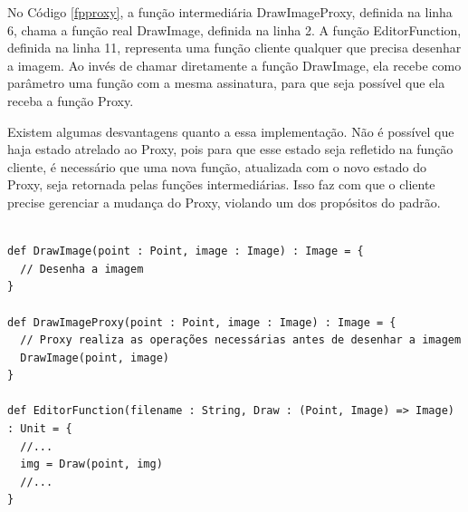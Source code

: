 No Código \ref{fpproxy}, a função intermediária 
DrawImageProxy, definida na linha 6, chama a 
função real DrawImage, definida na linha 2. 
A função EditorFunction, definida na linha 11, 
representa uma função cliente qualquer que 
precisa desenhar a imagem. Ao invés de chamar 
diretamente a função DrawImage, ela recebe 
como parâmetro uma função com a mesma assinatura, 
para que seja possível que ela receba a função 
Proxy.

Existem algumas desvantagens quanto a essa 
implementação. Não é possível que haja 
estado atrelado ao Proxy, pois para que 
esse estado seja refletido na função 
cliente, é necessário que uma nova função, 
atualizada com o novo estado do Proxy, seja 
retornada pelas funções intermediárias. 
Isso faz com que o cliente precise gerenciar 
a mudança do Proxy, violando 
um dos propósitos do padrão. 

\begin{lstlisting}[caption={Proxy Funcional.},label=fpproxy]
    
def DrawImage(point : Point, image : Image) : Image = {
  // Desenha a imagem
}

def DrawImageProxy(point : Point, image : Image) : Image = {
  // Proxy realiza as operações necessárias antes de desenhar a imagem
  DrawImage(point, image)
}

def EditorFunction(filename : String, Draw : (Point, Image) => Image) : Unit = {
  //...
  img = Draw(point, img)
  //...
}
    
\end{lstlisting}